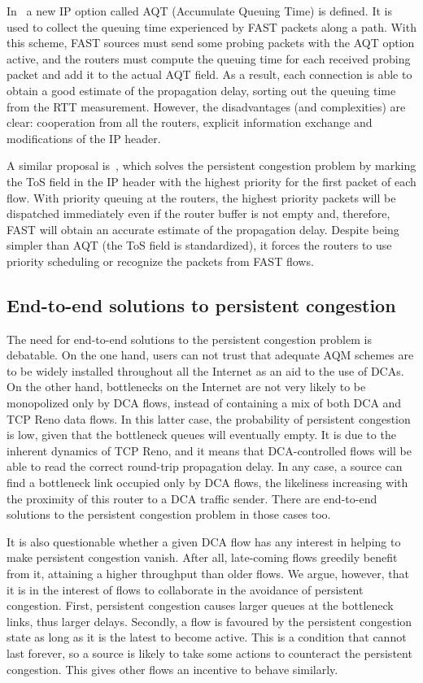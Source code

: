 \documentclass[english,times]{ettauth}
\begin{document}
In~\cite{Chan04} a new IP option called AQT (Accumulate Queuing Time) is
defined. It is used to collect the queuing time experienced by FAST packets
along a path.  With this scheme, FAST sources must send some probing packets
with the AQT option active, and the routers must compute the queuing time for
each received probing packet and add it to the actual AQT field. As a result,
each connection is able to obtain a good estimate of the propagation delay,
sorting out the queuing time from the RTT measurement. However, the
disadvantages (and complexities) are clear: cooperation from all the routers,
explicit information exchange and modifications of the IP header.

A similar proposal is~\cite{Tan05}, which solves the persistent congestion
problem by marking the ToS field in the IP header with the highest priority
for the first packet of each flow. With priority queuing at the routers, the
highest priority packets will be dispatched immediately even if the router
buffer is not empty and, therefore, FAST will obtain an accurate estimate of
the propagation delay. Despite being simpler than AQT (the ToS field is
standardized), it forces the routers to use priority scheduling or recognize
the packets from FAST flows.


\subsection{End-to-end solutions to persistent congestion}
\label{sec:end-end-solutions}

The need for end-to-end solutions to the persistent congestion problem is
debatable. On the one hand, users can not trust that adequate AQM schemes are
to be widely installed throughout all the Internet as an aid to the use of
DCAs. On the other hand, bottlenecks on the Internet are not very likely to be
monopolized only by DCA flows, instead of containing a mix of both DCA and TCP
Reno data flows. In this latter case, the probability of persistent congestion
is low, given that the bottleneck queues will eventually empty. It is due to
the inherent dynamics of TCP Reno, and it means that DCA-controlled flows will
be able to read the correct round-trip propagation delay. In any case, a
source can find a bottleneck link occupied only by DCA flows, the likeliness
increasing with the proximity of this router to a DCA traffic sender. There
are end-to-end solutions to the persistent congestion problem in those cases
too.

It is also questionable whether a given DCA flow has any interest in helping
to make persistent congestion vanish. After all, late-coming flows greedily
benefit from it, attaining a higher throughput than older flows. We argue,
however, that it is in the interest of flows to collaborate in the avoidance
of persistent congestion. First, persistent congestion causes larger queues at
the bottleneck links, thus larger delays. Secondly, a flow is favoured by the
persistent congestion state as long as it is the latest to become active. This
is a condition that cannot last forever, so a source is likely to take some
actions to counteract the persistent congestion. This gives other flows an
incentive to behave similarly.
\end{document}

